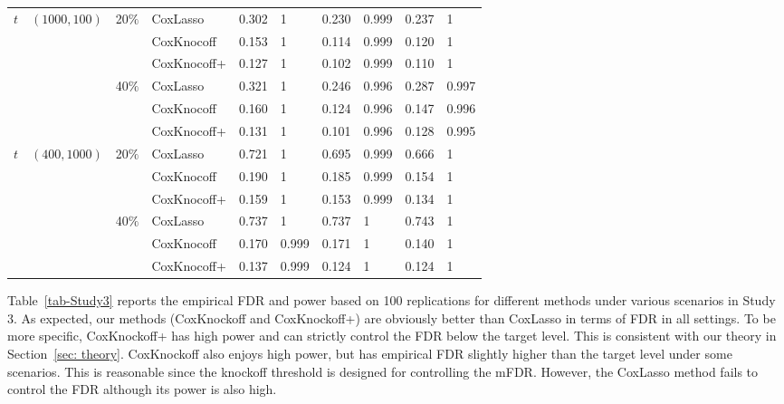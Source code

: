 \documentclass[11pt]{article}
\begin{document}
\begin{center}
\begin{table}[h!]
{\begin{tabular}{llll cl cl cl}
				\midrule
				$t$         & $(1000,100)$ & 20$\%$  & CoxLasso    &  0.302  & 1   & 0.230 & 0.999 & 0.237 & 1\\
				&              &         & CoxKnocoff  &  0.153  & 1   & 0.114 & 0.999 & 0.120 & 1 \\
				&              &         & CoxKnocoff+ &  0.127  & 1   & 0.102 & 0.999 & 0.110 & 1\\
				&              & 40$\%$  & CoxLasso    &  0.321  & 1   & 0.246 & 0.996 & 0.287 & 0.997 \\
				&              &         & CoxKnocoff  &  0.160  & 1   & 0.124 & 0.996 & 0.147 & 0.996 \\
				&              &         & CoxKnocoff+ &  0.131  & 1   & 0.101 & 0.996 & 0.128 & 0.995\\ 	 
				\midrule
				$t$         & $(400,1000)$ & 20$\%$ & CoxLasso    &  0.721   & 1   & 0.695 & 0.999 & 0.666 & 1 \\
				&              &        & CoxKnocoff  &  0.190   & 1   & 0.185 & 0.999 & 0.154 & 1 \\
				&              &        & CoxKnocoff+ &  0.159   & 1   & 0.153 & 0.999 & 0.134 & 1\\
				&              & 40$\%$ & CoxLasso    &  0.737   & 1   & 0.737 & 1     & 0.743 & 1\\
				&              &        & CoxKnocoff  &  0.170   & 0.999 & 0.171 & 1   & 0.140 & 1\\
				&              &        & CoxKnocoff+ &  0.137   & 0.999 & 0.124 & 1   & 0.124 & 1\\ 			
				\bottomrule
			\end{tabular}}
		\end{table}
	\end{center}
	
	
	
Table~\ref{tab-Study3} reports the empirical FDR and power based on 100 replications for different methods 
under various scenarios in Study 3. As expected, our methods (CoxKnockoff and CoxKnockoff+) are obviously better than CoxLasso in terms of FDR in all settings. To be more specific, CoxKnockoff+ has high power and 
can strictly control the FDR below the target level.  This is consistent with our theory in Section~\ref{sec: theory}. CoxKnockoff also enjoys high power, but has empirical FDR slightly higher than the target level under some scenarios. This is reasonable since the knockoff threshold is designed for controlling the mFDR. However, the CoxLasso method fails to control the FDR although its power is also high.
	
\end{document}
